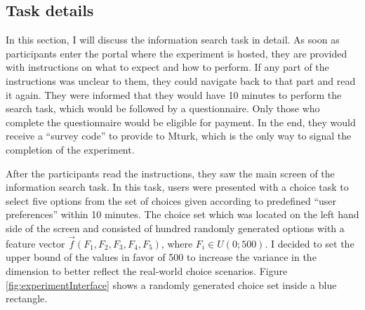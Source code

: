 \documentclass[a4paper,12pt]{article}
\begin{document}
\subsection{Task details}

In this section, I will discuss the information search task in detail. As soon as participants enter the portal where the experiment is hosted, they are provided with instructions on what to expect and how to perform. If any part of the instructions was unclear to them, they could navigate back to that part and read it again. They were informed that they would have 10 minutes to perform the search task, which would be followed by a questionnaire. Only those who complete the questionnaire would be eligible for payment. In the end, they would receive a ``survey code'' to provide to Mturk, which is the only way to signal the completion of the experiment. 

After the participants read the instructions, they saw the main screen of the information search task. In this task, users were presented with a choice task to select five options from the set of choices given according to predefined ``user preferences'' within 10 minutes. The choice set which was located on the left hand side of the screen and consisted of hundred randomly generated options with a feature vector $\vec f(F_1, F_2, F_3, F_4, F_5)$, where $ F_i \in U(0; 500)$. I decided to set the upper bound of the values in favor of 500 to increase the variance in the dimension to better reflect the real-world choice scenarios. Figure \ref{fig:experimentInterface} shows a randomly generated choice set inside a blue rectangle.
\end{document}
